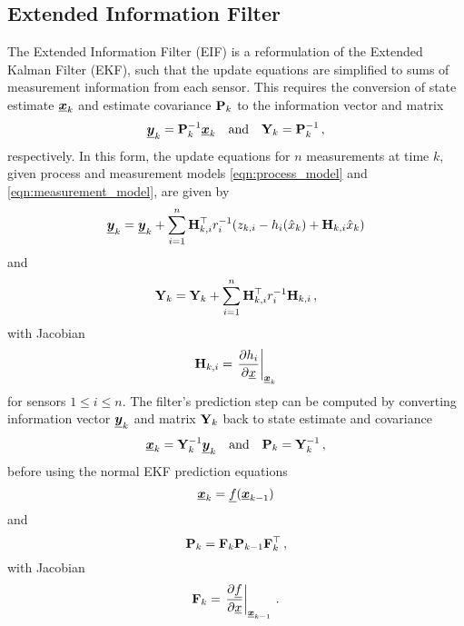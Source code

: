 \documentclass[twocolumn]{autart}
\begin{document}
\subsection{Extended Information Filter}
The Extended Information Filter (EIF) \cite{maybeckStochasticModelsEstimation1982} is a reformulation of the Extended Kalman Filter (EKF), such that the update equations are simplified to sums of measurement information from each sensor. This requires the conversion of state estimate ${\boldsymbol{\underline{x}}}_k$ and estimate covariance ${{\mathbf{P}}}_k$ to the information vector and matrix
\begin{equation}
    {\boldsymbol{\underline{y}}}_k = {{\mathbf{P}}}_k^{-1}{\boldsymbol{\underline{x}}}_k \quad\textrm{and}\quad {\ensuremath{{\mathbf{Y}}}}_k = {{\mathbf{P}}}_k^{-1}\,,
\end{equation}
respectively. In this form, the update equations for $n$ measurements at time $k$, given process and measurement models \eqref{eqn:process_model} and \eqref{eqn:measurement_model}, are given by
\begin{equation}
    {\boldsymbol{\underline{y}}}_k = {\boldsymbol{\underline{y}}}_{k} + \sum^n_{i=1}{{\mathbf{H}}}^\top_{k,i} r^{-1}_i (z_{k,i} - h_i(\hat{x}_k) + {{\mathbf{H}}}_{k,i}\hat{x}_k) \label{eqn:eif_info_vec_update}
\end{equation}
and
\begin{equation}
    {\ensuremath{{\mathbf{Y}}}}_k = {{\mathbf{Y}}}_{k} + \sum^n_{i=1}{{\mathbf{H}}}^\top_{k,i} r^{-1}_i {{\mathbf{H}}}_{k,i}\,, \label{eqn:eif_info_mat_update}
\end{equation}
with Jacobian
\begin{equation}
    {\ensuremath{{\mathbf{H}}}}_{k,i} = \left.\frac{\partial h_i}{\partial {\underline{x}}}\right|_{{\boldsymbol{\underline{x}}}_k} \label{eqn:measurement_jacobian}
\end{equation}
for sensors $1 \leq i \leq n$. The filter's prediction step can be computed by converting information vector ${\boldsymbol{\underline{y}}}_k$ and matrix ${{\mathbf{Y}}}_k$ back to state estimate and covariance 
\begin{equation}
    {\boldsymbol{\underline{x}}}_k = {{\mathbf{Y}}}_k^{-1}{\boldsymbol{\underline{y}}}_k \quad\textrm{and}\quad {\ensuremath{{\mathbf{P}}}}_k = {{\mathbf{Y}}}_k^{-1}\,,
\end{equation}
before using the normal EKF prediction equations
\begin{equation}
    {\boldsymbol{\underline{x}}}_k = {\underline{f}}({\boldsymbol{\underline{x}}}_{k-1})
\end{equation}
and
\begin{equation}
    {\ensuremath{{\mathbf{P}}}}_k = {{\mathbf{F}}}_k{{\mathbf{P}}}_{k-1}{{\mathbf{F}}}_k^\top\,,
\end{equation}
with Jacobian
\begin{equation}
    {\ensuremath{{\mathbf{F}}}}_{k} = \left.\frac{\partial {\underline{f}}}{\partial {\underline{x}}}\right|_{{\boldsymbol{\underline{x}}}_{k-1}}\,. \label{eqn:jacobian_f}
\end{equation}
\end{document}
